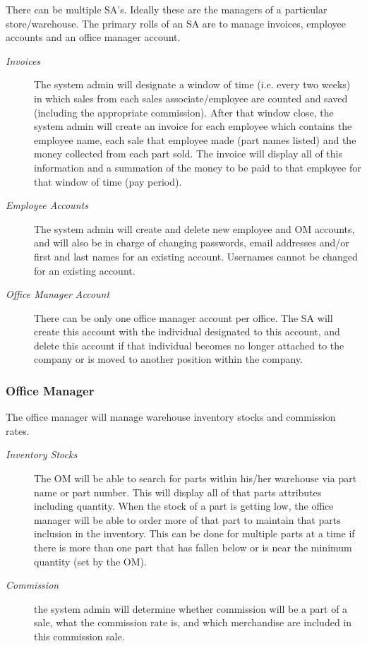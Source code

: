 \documentclass{report}
\begin{document}
There can be multiple SA’s. Ideally these are the managers of a particular store/warehouse. The primary rolls of an SA are to manage invoices, employee accounts and an office manager account.\par
\begin{description}
  \item [\textit{Invoices}] The system admin will designate a window of time (i.e. every two weeks) in which sales from each sales associate/employee are counted and saved (including the appropriate commission). After that window close, the system admin will create an invoice for each employee which contains the employee name, each sale that employee made (part names listed) and the money collected from each part sold. The invoice will display all of this information and a summation of the money to be paid to that employee for that window of time (pay period).
  \item [\textit{Employee Accounts}] The system admin will create and delete new employee and OM accounts, and will also be in charge of changing passwords, email addresses and/or first and last names for an existing account. Usernames cannot be changed for an existing account.\par
  \item [\textit{Office Manager Account}] There can be only one office manager account per office. The SA will create this account with the individual designated to this account, and delete this account if that individual becomes no longer attached to the company or is moved to another position within the company.\par
\end{description}

\subsubsection{Office Manager}
\label{sec:om}

The office manager will manage warehouse inventory stocks and commission rates.\par
\begin{description}
  \item [\textit{Inventory Stocks}] The OM will be able to search for parts within his/her warehouse via part name or part number. This will display all of that parts attributes including quantity. When the stock of a part is getting low, the office manager will be able to order more of that part to maintain that parts inclusion in the inventory. This can be done for multiple parts at a time if there is more than one part that has fallen below or is near the minimum quantity (set by the OM).\par
  \item [\textit{Commission}] the system admin will determine whether commission will be a part of a sale, what the commission rate is, and which merchandise are included in this commission sale.\par
\end{description}
\end{document}
